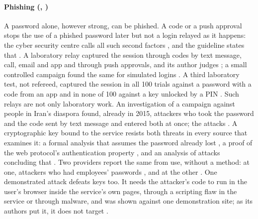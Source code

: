 \paragraph{Phishing (, )}
A password alone, however strong, can be phished.
A code or a push approval stops the use of a phished password later but
not a login relayed as it happens: the cyber security centre calls all
such second factors
, and
the guideline states that
.
A laboratory relay captured the session through codes by text message,
call, email and app and through push approvals, and its author judges
; a small controlled campaign found the same for
simulated logins \autocite{Cuellar2026AiTM}.
A third laboratory test, not refereed, captured the session in all 100
trials against a password with a code from an app and in none of 100
against a key unlocked by a PIN \autocite[sec.~7.2]{Wasser2026Resilience}.
Such relays are not only laboratory work.
An investigation of a campaign against people in Iran's diaspora found,
already in 2015, attackers who took the password and the code sent by
text message and entered both at once; the attacks
.
A cryptographic key bound to the service resists both threats in every
source that examines it: a formal analysis that assumes the password
already lost \autocite{Jacomme2021FormalMFA}, a proof of the web
protocol's authentication property \autocite{Barbosa2021ProvableFIDO2},
and an analysis of attacks concluding that
.
Two providers report the same from use, without a method: at one,
attackers who had employees' passwords
, and at the other
.
One demonstrated attack defeats keys too.
It needs the attacker's code to run in the user's browser inside the
service's own pages, through a scripting flaw in the service or through
malware, and was shown against one demonstration site; as its authors
put it, it does not target
.

